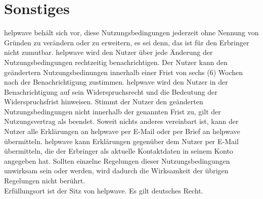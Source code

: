 \documentclass[10pt]{article}
\begin{document}
\section{Sonstiges}
helpwave behält sich vor, diese Nutzungsbedingungen jederzeit ohne Nennung von Gründen zu verändern oder zu erweitern,
es sei denn, das ist für den Erbringer nicht zumutbar. helpwave wird den Nutzer über jede Änderung der Nutzungsbedingungen rechtzeitig benachrichtigen. Der Nutzer kann den geändertern Nutzungsbedinungen innerhalb einer Frist von sechs (6) Wochen nach der Benachrichtigung zustimmen. helpwave wird den Nutzer in der Benachrichtigung auf sein Widerspruchsrecht und die Bedeutung der Widerspruchsfrist hinweisen. Stimmt der Nutzer den geänderten Nutzungsbedingungen nicht innerhalb der genannten Frist zu, gilt der Nutzungsvertrag als beendet. Soweit nichts anderes vereinbart ist, kann der Nutzer alle Erklärungen an helpwave per E-Mail oder per Brief an helpwave
übermitteln. helpwave kann Erklärungen gegenüber dem Nutzer per E-Mail übermitteln, die der
Erbringer als aktuelle Kontaktdaten in seinem Konto angegeben hat.
Sollten einzelne Regelungen dieser Nutzungsbedingungen unwirksam sein oder werden, wird dadurch die Wirksamkeit der
übrigen Regelungen nicht berührt. \\
Erfüllungsort ist der Sitz von helpwave.
Es gilt deutsches Recht.
\end{document}
